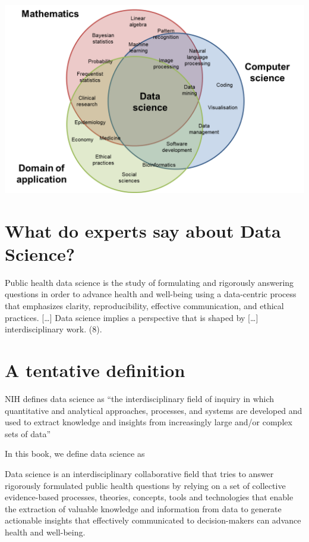\documentclass[
  letterpaper,
  DIV=11,
  numbers=noendperiod,
  oneside]{scrreprt}
\begin{document}
\includegraphics{images/paste-494B1CA8.png}

\hypertarget{what-do-experts-say-about-data-science}{%
\section{What do experts say about Data
Science?}\label{what-do-experts-say-about-data-science}}

Public health data science is the study of formulating and rigorously
answering questions in order to advance health and well-being using a
data-centric process that emphasizes clarity, reproducibility, effective
communication, and ethical practices. {[}\ldots{]} Data science implies
a perspective that is shaped by {[}\ldots{]} interdisciplinary work.
(8).

\hypertarget{a-tentative-definition}{%
\section{A tentative definition}\label{a-tentative-definition}}

NIH defines data science as ``the interdisciplinary field of inquiry in
which quantitative and analytical approaches, processes, and systems are
developed and used to extract knowledge and insights from increasingly
large and/or complex sets of data''

In this book, we define data science as

Data science is an interdisciplinary collaborative field that tries to
answer rigorously formulated public health questions by relying on a set
of collective evidence-based processes, theories, concepts, tools and
technologies that enable the extraction of valuable knowledge and
information from data to generate actionable insights that effectively
communicated to decision-makers can advance health and well-being.
\end{document}
